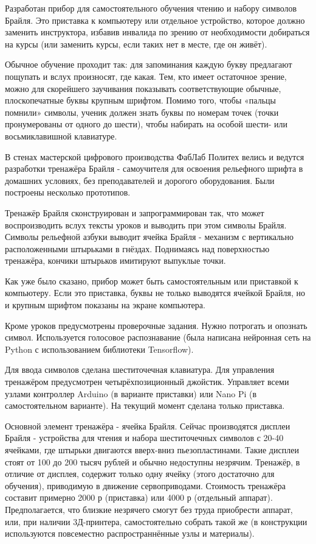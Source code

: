 \documentclass[a4paper,12pt]{article} %
\begin{document}
Разработан прибор для самостоятельного обучения чтению и набору символов Брайля. Это приставка к компьютеру или отдельное устройство, которое должно заменить инструктора, избавив инвалида по зрению от необходимости добираться на курсы (или заменить курсы, если таких нет в месте, где он живёт).

Обычное обучение проходит так: для запоминания каждую букву предлагают пощупать и вслух произносят, где какая. Тем, кто имеет остаточное зрение, можно для скорейшего заучивания показывать соответствующие обычные, плоскопечатные буквы крупным шрифтом. Помимо того, чтобы «пальцы помнили» символы, ученик должен знать буквы по номерам точек (точки пронумерованы от одного до шести), чтобы набирать на особой шести- или восьмиклавишной клавиатуре.

В стенах мастерской цифрового производства ФабЛаб Политех велись и ведутся разработки тренажёра Брайля - самоучителя для освоения рельефного шрифта в домашних условиях, без преподавателей и дорогого оборудования. Были построены несколько прототипов.

Тренажёр Брайля сконструирован и запрограммирован так, что может воспроизводить вслух тексты уроков и выводить при этом символы Брайля. Символы рельефной азбуки выводит ячейка Брайля - механизм с вертикально расположенными штырьками в гнёздах. Поднимаясь над поверхностью тренажёра, кончики штырьков имитируют выпуклые точки.

Как уже было сказано, прибор может быть самостоятельным или приставкой к компьютеру. Если это приставка, буквы не только выводятся ячейкой Брайля, но и крупным шрифтом показаны на экране компьютера.

Кроме уроков предусмотрены проверочные задания. Нужно потрогать и опознать символ. Используется голосовое распознавание (была написана нейронная сеть на Python с использованием библиотеки Tensorflow).

Для ввода символов сделана шеститочечная клавиатура. Для управления тренажёром предусмотрен четырёхпозиционный джойстик. Управляет всеми узлами контроллер Arduino (в варианте приставки) или Nano Pi (в самостоятельном варианте). На текущий момент сделана только приставка.

Основной элемент тренажёра - ячейка Брайля. Сейчас производятся дисплеи Брайля - устройства для чтения и набора шеститочечных символов с 20-40 ячейками, где штырьки двигаются вверх-вниз пьезопластинами. Такие дисплеи стоят от 100 до 200 тысяч рублей и обычно недоступны незрячим. Тренажёр, в отличие от дисплея, содержит только одну ячейку (этого достаточно для обучения), приводимую в движение сервоприводами. Стоимость тренажёра составит примерно 2000 р (приставка) или 4000 р (отдельный аппарат). Предполагается, что близкие незрячего смогут без труда приобрести аппарат, или, при наличии 3Д-принтера, самостоятельно собрать такой же (в конструкции используются повсеместно распространнённые узлы и материалы).
\end{document}
